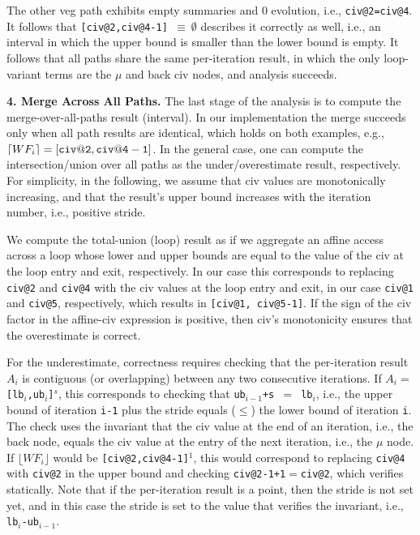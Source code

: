 \documentclass{sig-alternate}
\begin{document}
The other {\sc veg} path exhibits empty summaries and $0$ evolution,
i.e., {\tt civ@2=civ@4}. 
It follows that {\tt [civ@2,civ@4-1] $\equiv \ \emptyset$}  
describes it correctly as well, i.e., an interval in which the upper bound 
is smaller than the lower bound is empty.
  It follows that all paths share the same per-iteration result, 
in which the only loop-variant terms are the $\mu$ and back {\sc civ} nodes, 
and analysis succeeds.


\vspace{1ex}

{\bf 4. Merge Across All Paths.} 
%
The last stage of the analysis is to compute the merge-over-all-paths result (interval).
In our implementation the merge succeeds only when all path results are 
identical, which holds on both examples, e.g., $\lceil WF_i \rceil = {\tt [civ@2,civ@4-1]}$.
In the general case, one can compute the intersection/union over all paths as the  
under/overestimate result, respectively.
For simplicity, in the following, we assume that {\sc civ} values are monotonically 
increasing, and that the result's upper bound increases with the iteration number,
i.e., positive stride. 


We compute the total-union (loop) result as if we aggregate an affine access
across a loop whose lower and upper bounds are equal to the value of the 
{\sc civ} at the loop entry and exit, respectively.  
%
In our case this corresponds to replacing {\tt civ@2} and {\tt civ@4} 
with the {\sc civ} values at the loop entry and exit, in our case 
{\tt civ@1} and {\tt civ@5}, respectively, which results in
{\tt [civ@1, civ@5-1]}.   If the sign of the {\sc civ} factor in
the affine-{\sc civ} expression is positive, then {\sc civ}'s
monotonicity ensures that the overestimate is correct. 

For the underestimate, correctness requires checking that the
per-iteration result $A_i$ is contiguous (or overlapping) 
between any two consecutive iterations. If $A_i=${\tt[lb$_i$,ub$_i$]$^s$},
this corresponds to checking that {\tt ub$_{i-1}$+s $=$ lb$_i$},
i.e., the upper bound of iteration {\tt i-1} plus the stride equals ($\leq$) 
the lower bound of iteration {\tt i}.
%
The check uses the invariant that the {\sc civ} value  
at the end of an iteration, i.e., the back node, equals 
the {\sc civ} value at the entry of the next iteration,
i.e., the $\mu$ node.
%
If $\lfloor WF_i \rfloor$ would be {\tt [{\tt civ@2},{\tt civ@4}-1]$^1$},
this would correspond to replacing {\tt civ@4} with {\tt civ@2} in the upper 
bound and checking {\tt civ@2-1+1$=$civ@2}, which verifies statically. 
%
Note that if the per-iteration result is a point, then the stride is 
not set yet, and in this case the stride is set to the value that 
verifies the invariant, i.e., {\tt lb$_i$-ub$_{i-1}$}.
\end{document}
